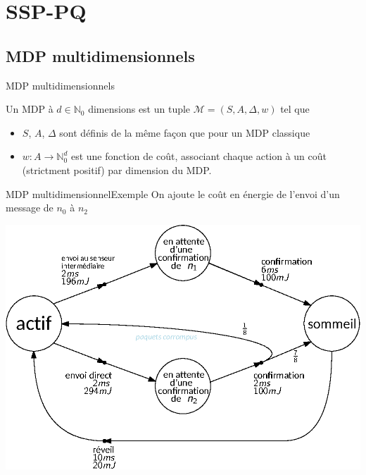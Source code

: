\documentclass[compress]{beamer}
\theoremstyle{theorem}%
\begin{document}
\section{SSP-PQ}
\subsection{MDP multidimensionnels}
\begin{frame}{MDP multidimensionnels}
  \begin{definition}
    Un MDP à $d \in \mathbb{N}_0$ dimensions est un tuple $\mathcal{M} = (S, A, \Delta, w)$ tel que
    \begin{itemize}
      \item $S$, $A$, $\Delta$ sont définis de la même façon que pour un MDP classique
      \item $w : A \rightarrow \mathbb{N}_0^d$ est une fonction de coût, associant chaque action à un coût (strictment positif) par dimension du MDP.
    \end{itemize}
  \end{definition}
\end{frame}

\begin{frame}{MDP multidimensionnel}{Exemple}
    On ajoute le coût en énergie de l'envoi d'un message de $n_0$ à $n_2$
  \begin{center}
    \includegraphics[width=0.7\linewidth]{resources/mdpmdp}
  \end{center}
\end{frame}
\end{document}
